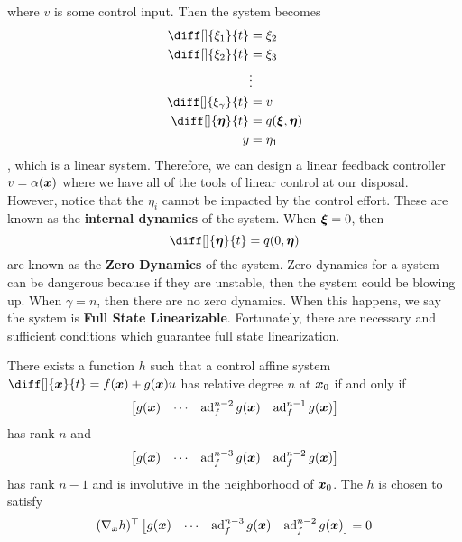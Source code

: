 where $v$ is some control input. Then the system becomes
\[
	\begin{aligned}
		\diff[]{\xi_1}{t} &= \xi_2\\
		\diff[]{\xi_2}{t} &= \xi_3\\
		&\vdots\\
		\diff[]{\xi_{\gamma}}{t} &= v\\
		\diff[]{\bs{\eta}}{t} &= q(\bs{\xi}, \bs{\eta})\\
		y &= \eta_1
	\end{aligned}
\],
which is a linear system. Therefore, we can design a linear feedback controller $v
= \alpha(\boldsymbol{x})$
where we have all of the tools of linear control at our disposal. However,
notice that the $\eta_i$ cannot be impacted by the control effort. These are
known as the \textbf{internal dynamics} of the system. When $\boldsymbol{\xi} = 0$,
then \[
	\diff[]{\bs{\eta}}{t} = q(0, \bs{\eta})
\]
are known as the \textbf{Zero Dynamics} of the system. Zero dynamics for a
system can be dangerous because if they are unstable, then the system could be
blowing up. When $\gamma = n$, then there are no zero dynamics. When this
happens, we say the system is \textbf{Full State Linearizable}. Fortunately,
there are necessary and sufficient conditions which guarantee full state
linearization.
\begin{theorem}
	There exists a function $h$ such that a control affine system
	$\diff[]{\bs{x}}{t} = f(\bs{x}) + g(\bs{x})u$ has relative degree $n$ at
	$\boldsymbol{x}_0$ if and only if \[
		\begin{bmatrix}
			g(\boldsymbol{x}) & \cdots & \operatorname*{ad}_f^{n-2}g(\boldsymbol{x}) & \operatorname*{ad}_f^{n-1}g(\boldsymbol{x})
		\end{bmatrix}
	\]
	has rank $n$ and \[
		\begin{bmatrix}
			g(\boldsymbol{x}) & \cdots & \operatorname*{ad}_f^{n-3}g(\boldsymbol{x}) & \operatorname*{ad}_f^{n-2}g(\boldsymbol{x})
		\end{bmatrix}
	\]
	has rank $n-1$ and is involutive in the neighborhood of $\boldsymbol{x}_0$. The $h$ is
	chosen to satisfy \[
		(\nabla_{\boldsymbol{x}}h)^\top \begin{bmatrix}
			g(\boldsymbol{x}) & \cdots & \operatorname*{ad}_f^{n-3}g(\boldsymbol{x}) & \operatorname*{ad}_f^{n-2}g(\boldsymbol{x})
		\end{bmatrix} = 0
	\]
	\label{thm:full-state-linearization}
\end{theorem}
